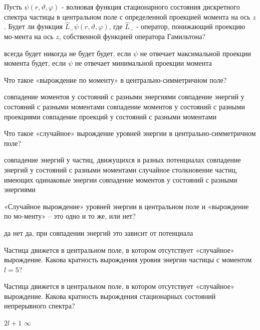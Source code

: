 \documentclass[11pt,a4paper]{exam}
\begin{document}
\begin{questions}
\question Пусть $\psi (r,\vartheta ,\varphi )$ - волновая функция стационарного состояния дискретного спектра частицы в центральном поле с определенной проекцией момента на ось $z$. Будет ли функция ${\hat L_ - }\psi (r,\vartheta ,\varphi )$, где ${\hat L_ - }$ - оператор, понижающий проекцию мо-мента на ось $z$, собственной функцией оператора Гамильтона?
\begin{choices}
\choice всегда будет
\choice никогда не будет
\choice будет, если $\psi $ не отвечает максимальной проекции момента
\choice будет, если $\psi $ не отвечает минимальной проекции момента
\end{choices}

\question Что такое «вырождение по моменту» в центрально-симметричном поле?
\begin{choices}
\choice совпадение моментов у состояний с разными энергиями
\choice совпадение энергий у состояний с разными моментами
\choice совпадение моментов у состояний с разными проекциями
\choice совпадение проекций у состояний с разными моментами
\end{choices}

\question Что такое «случайное» вырождение уровней энергии в центрально-симметричном поле?
\begin{choices}
\choice совпадение энергий у частиц, движущихся в разных потенциалах
\choice совпадение энергий у состояний с разными моментами
\choice случайное столкновение частиц, имеющих одинаковые энергии
\choice совпадение моментов у состояний с разными энергиями
\end{choices}

\question «Случайное вырождение» уровней энергии в центральном поле и «вырождение по мо-менту» – это одно и то же, или нет?
\begin{choices}
\choice да                
\choice нет
\choice да, при совпадении энергий    
\choice это зависит от потенциала
\end{choices}

\question Частица движется в центральном поле, в котором отсутствует «случайное» вырождение. Какова кратность вырождения уровня энергии частицы с моментом $l = 5$?
\begin{choices}
\end{choices}

\question Частица движется в центральном поле, в котором отсутствует «случайное» вырождение. Какова кратность вырождения стационарных состояний непрерывного спектра?
\begin{choices}
\choice $2l + 1$    
\choice $\infty $         
\end{choices}


\end{questions}
\end{document}

